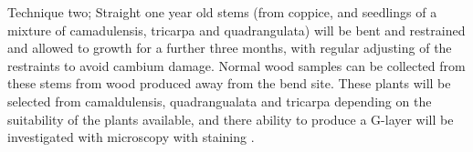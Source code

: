 Technique two; Straight one year old stems (from coppice, and seedlings of a
mixture of camadulensis, tricarpa and quadrangulata) will be bent and restrained
and allowed to growth for a further three months, with regular adjusting of the
restraints to avoid cambium damage. Normal wood samples can be collected from
these stems from wood produced away from the bend site. These plants will be
selected from camaldulensis,
quadrangualata and tricarpa depending on the suitability of the plants
available, and there ability to produce a G-layer will be investigated with
microscopy with staining \cite{Qiu_2008}.